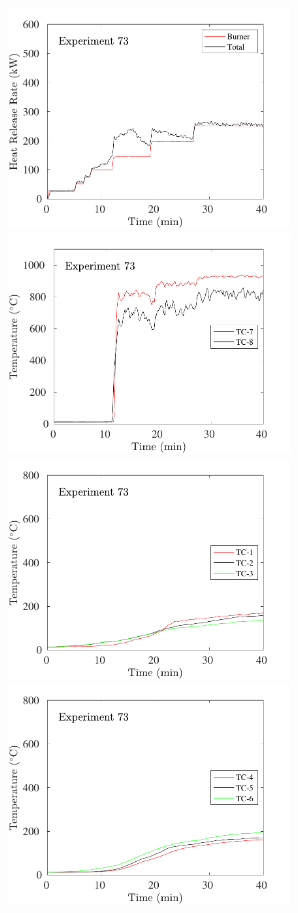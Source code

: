 \begin{figure}[H]
\includegraphics[height=2.30in]{../SCRIPT_FIGURES/Test_73_HRR} \hfill
\includegraphics[height=2.30in]{../SCRIPT_FIGURES/Test_73_TC_7-8} \\
\includegraphics[height=2.30in]{../SCRIPT_FIGURES/Test_73_TC_1-3} \hfill
\includegraphics[height=2.30in]{../SCRIPT_FIGURES/Test_73_TC_4-6}

\end{figure}
